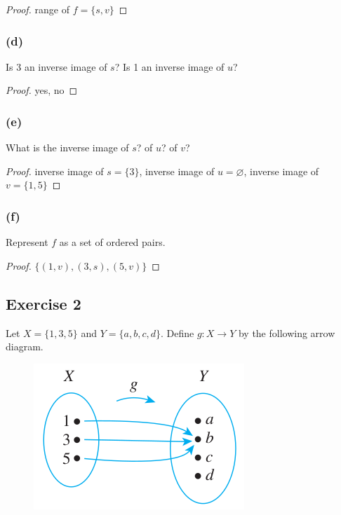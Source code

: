 \documentclass[14pt]{extarticle}
\newcommand{\es}{\varnothing}
\begin{document}
\begin{proof}
range of \(f = \{s, v\}\)
\end{proof}

\subsubsection{(d)}
Is 3 an inverse image of $s$? Is 1 an inverse image of $u$?

\begin{proof}
yes, no
\end{proof}

\subsubsection{(e)}
What is the inverse image of $s$? of $u$? of $v$?

\begin{proof}
inverse image of \(s = \{3\}\), inverse image of \(u = \es\), inverse image of \(v = \{1, 5\}\)
\end{proof}

\subsubsection{(f)}
Represent $f$ as a set of ordered pairs.

\begin{proof}
\(\{(1, v), (3, s), (5, v)\}\)
\end{proof}

\subsection{Exercise 2}
Let \(X = \{1, 3, 5\}\) and \(Y = \{a, b, c, d\}\). Define \(g: X \to Y\) by the following arrow diagram.

\begin{figure}[ht!]
\centering
\includegraphics[scale=0.6]{../images/7.1.2.png}
\end{figure}
\end{document}
